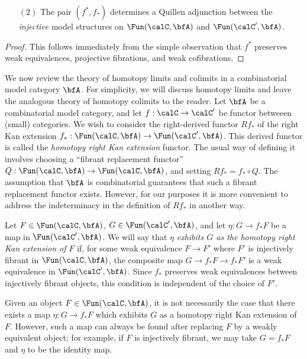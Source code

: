 \begin{Model Categories}
\begin{Didn't Read}
\begin{proposition}
\begin{itemize}
\item[$(2)$] The pair $( f^{\ast}, f_{\ast} )$ determines a
Quillen adjunction between the {\em injective} model structures on
$\Fun(\calC, \bfA)$ and $\Fun(\calC', \bfA)$.
\end{itemize}
\end{proposition}

\begin{proof}
This follows immediately from the simple observation that
$f^{\ast}$ preserves weak equivalences, projective fibrations, and weak
cofibrations.
\end{proof}

We now review the theory of homotopy limits and colimits in a combinatorial model category $\bfA$. For simplicity, we will discuss homotopy limits and leave the analogous theory of homotopy colimits
to the reader. Let $\bfA$ be a combinatorial model category, and let 
$f: \calC \rightarrow \calC'$ be functor betweeen (small) categories. 
We wish to consider the right-derived functor $Rf_{\ast}$ of the right Kan extension $f_{\ast}: \Fun(\calC, \bfA) \rightarrow
\Fun(\calC', \bfA)$. This derived functor is called the {\it homotopy right Kan extension} functor.
The usual way of defining it involves choosing a ``fibrant replacement functor'' $Q: \Fun(\calC, \bfA) \rightarrow \Fun(\calC, \bfA)$, and setting $Rf_{\ast} = f_{\ast} \circ Q$. The assumption that $\bfA$ is combinatorial guarantees that such a fibrant replacement functor exists. However, for our purposes it is more convenient to address the indeterminacy in the definition of $Rf_{\ast}$ in another way.

Let $F \in \Fun(\calC, \bfA)$, $G \in \Fun(\calC', \bfA)$, and let $\eta: G \rightarrow f_{\ast} F$ be a map in $\Fun(\calC', \bfA)$. We will say that $\eta$ {\it exhibits $G$ as the homotopy right Kan extension of $F$}
if, for some weak equivalence $F \rightarrow F'$ where $F'$ is injectively fibrant in $\Fun(\calC, \bfA)$, the composite map $G \rightarrow f_{\ast} F \rightarrow f_{\ast} F'$ is a weak equivalence in
$\Fun(\calC', \bfA)$. Since $f_{\ast}$ preserves weak equivalences between injectively fibrant objects, this condition is independent of the choice of $F'$.

\begin{remark}
Given an object $F \in \Fun(\calC, \bfA)$, it is not necessarily the case that there exists a map
$\eta: G \rightarrow f_{\ast} F$ which exhibits $G$ as a homotopy right Kan extension of $F$. 
However, such a map can always be found after replacing $F$ by a weakly equivalent object; for example, if $F$ is injectively fibrant, we may take $G = f_{\ast} F$ and $\eta$ to be the identity map.
\end{remark}


\end{Didn't Read}
\end{Model Categories}
